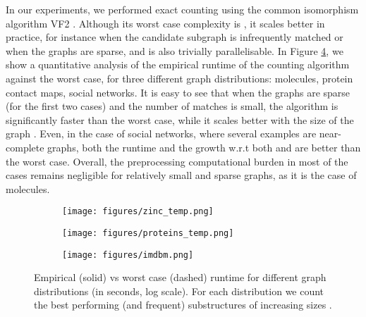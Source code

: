 \documentclass{article} \usepackage{iclr2021_conference,times}
\begin{document}
In our experiments, we performed exact counting using the common isomorphism algorithm VF2 \citep{DBLP:journals/pami/CordellaFSV04}. Although its worst case complexity is , it scales better in practice, for instance when the candidate subgraph is infrequently matched or when the graphs are sparse, and is also trivially parallelisable. In Figure \ref{fig:complexity}, we show a quantitative analysis of the empirical runtime of the counting algorithm against the worst case, for three different graph distributions: molecules, protein contact maps, social networks. It is easy to see that when the graphs are sparse (for the first two cases) and the number of matches is small, the algorithm is significantly faster than the worst case, while it scales better with the size of the graph . Even, in the case of social networks, where several examples are near-complete graphs, both the runtime and the growth w.r.t both  and  are  better than the worst case. Overall, the preprocessing computational burden in most of the cases remains negligible for relatively small and sparse graphs, as it is the case of molecules. 

\begin{figure}\vspace{-2mm}
     \centering
     \begin{subfigure}[b]{0.3\textwidth}
         \centering
         \texttt{[image: figures/zinc\_temp.png]}\vspace{-4mm}
\label{fig:y equals x}
     \end{subfigure}
     \hfill
     \begin{subfigure}[b]{0.3\textwidth}
         \centering
         \texttt{[image: figures/proteins\_temp.png]}\vspace{-4mm}
\label{fig:three sin x}
     \end{subfigure}
     \hfill
     \begin{subfigure}[b]{0.3\textwidth}
         \centering
         \texttt{[image: figures/imdbm.png]}\vspace{-4mm}
\label{fig:five over x}
     \end{subfigure}
        \caption{Empirical (solid) vs worst case (dashed) runtime for different graph distributions (in seconds, log scale). For each distribution we count the best performing (and frequent) substructures of increasing sizes .\vspace{-3mm}}
        \label{fig:complexity}
\end{figure}
\end{document}
